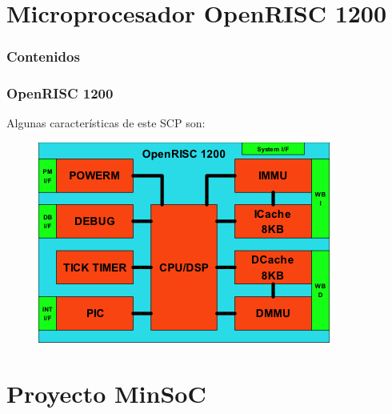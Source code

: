 \documentclass[xcolor=dvipsnames,mathserif,9pt]{beamer}
\begin{document}
\section{Microprocesador OpenRISC 1200}
  \begin{frame}
    \frametitle{Contenidos}
    \tableofcontents[currentsection]
  \end{frame}  

\begin{frame} \frametitle{OpenRISC 1200}%
Algunas características de este SCP son:

 
\begin{figure}[!h]
      \centering
     \includegraphics[scale=1]{figuras/OR1200}
    \end{figure}
\end{frame}

\section{Proyecto MinSoC}
\end{document}
